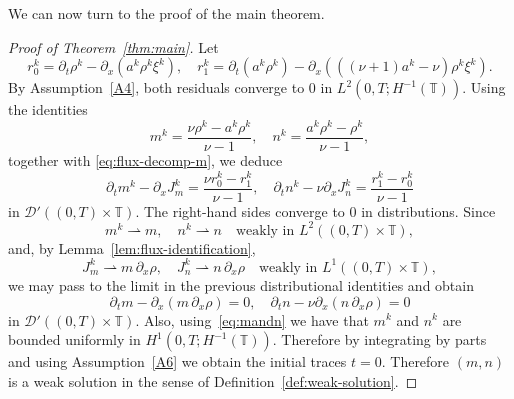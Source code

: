 \documentclass[a4paper,twosided,11pt]{article}
\newcommand{\T}{\mathbb{T}}
\newcommand{\p}{\partial}
\newcommand{\1}{\mathbf{1}}
\theoremstyle{plain}
\theoremstyle{remark}
\newcommand{\weakto}{\rightharpoonup}
\numberwithin{equation}{section}
\begin{document}
We can now turn to the proof of the main theorem. 

\begin{proof}[Proof of Theorem~\ref{thm:main}]
Let
$$
r_0^k=\p_t\rho^k-\p_x(a^k\rho^k\xi^k),
\quad
r_1^k=\p_t(a^k\rho^k)-\p_x\left(((\nu+1)a^k-\nu)\rho^k\xi^k\right).
$$
By Assumption~\ref{A4}, both residuals converge to $0$ in $L^2(0,T;H^{-1}(\T))$. Using the identities
$$
m^k=\frac{\nu\rho^k-a^k\rho^k}{\nu-1},
\quad
n^k=\frac{a^k\rho^k-\rho^k}{\nu-1},
$$
together with \eqref{eq:flux-decomp-m}, we deduce
\begin{equation}\label{eq:mandn}
\p_t m^k-\p_x J_m^k=\frac{\nu r_0^k-r_1^k}{\nu-1},
\quad
\p_t n^k-\nu\p_x J_n^k=\frac{r_1^k-r_0^k}{\nu-1}
\end{equation}
in $\mathcal D'((0,T)\times\T)$. The right-hand sides converge to $0$ in distributions. Since
$$
m^k\weakto m,
\quad
n^k\weakto n
\quad \text{weakly in } L^2((0,T)\times\T),
$$
and, by Lemma~\ref{lem:flux-identification},
$$
J_m^k\weakto m\,\p_x\rho,
\quad
J_n^k\weakto n\,\p_x\rho
\quad \text{weakly in } L^1((0,T)\times\T),
$$
we may pass to the limit in the previous distributional identities and obtain
$$
\p_t m-\p_x(m\,\p_x\rho)=0,
\quad
\p_t n-\nu\p_x(n\,\p_x\rho)=0
$$
in $\mathcal D'((0,T)\times\T)$. Also, using~\eqref{eq:mandn} we have that $m^k$ and $n^k$ are bounded uniformly in $H^{1}(0,T; H^{-1}(\T))$. Therefore by integrating by parts and using Assumption~\ref{A6} we obtain the initial traces $t=0$. Therefore $(m,n)$ is a weak solution in the sense of Definition~\ref{def:weak-solution}.
\end{proof}




\end{document}
